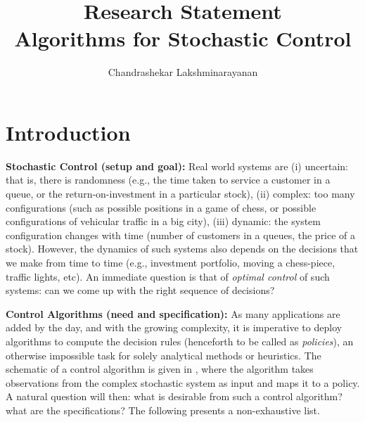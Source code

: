 \documentclass[onecolumn,12pt]{IEEEtran}
\title{\large Research Statement\\Algorithms for Stochastic Control}
\author{Chandrashekar Lakshminarayanan}
\begin{document}
\maketitle
%


\section{Introduction}
\textbf{Stochastic Control (setup and goal):} Real world systems are (i) uncertain: that is, there is randomness (e.g., the time taken to service a customer in a queue, or the return-on-investment in a particular stock), (ii) complex: too many configurations (such as possible positions in a game of chess, or possible configurations of vehicular traffic in a big city), (iii) dynamic: the system configuration changes with time (number of customers in a queues, the price of a stock). However, the dynamics of such systems also depends on the decisions that we make from time to time (e.g., investment portfolio, moving a chess-piece, traffic lights, etc). 
An immediate question is that of \emph{optimal control} of such systems: can we come up with the right sequence of decisions?

\textbf{Control Algorithms (need and specification):}  As many applications are added by the day, and with the growing complexity, it is imperative to deploy algorithms to compute the decision rules (henceforth to be called as \emph{policies}), an otherwise impossible task for solely analytical methods or heuristics. The schematic of a control algorithm is given in , where the algorithm takes observations from the complex stochastic system as input and 
maps it to a policy.  A natural question will then: what is desirable from such a control algorithm? what are the specifications? The following presents a non-exhaustive list.
\end{document}
